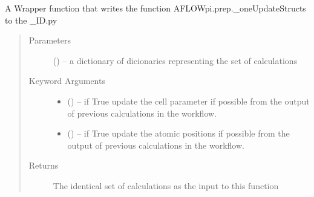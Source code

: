 \documentclass[letterpaper,10pt,english]{sphinxmanual}
\begin{document}

\begin{fulllineitems}
\label{\detokenize{prep:prep.updateStructs}}
A Wrapper function that writes the function AFLOWpi.prep.\_oneUpdateStructs to the \_ID.py
\begin{quote}\begin{description}
\item[{Parameters}] \leavevmode
{} () -- a dictionary of dicionaries representing the set of calculations

\item[{Keyword Arguments}] \leavevmode\begin{itemize}
\item {} 
 () -- if True update the cell parameter if possible from the
output of previous calculations in the workflow.

\item {} 
 () -- if True update the atomic positions if possible from the
output of previous calculations in the workflow.

\end{itemize}

\item[{Returns}] \leavevmode
The identical set of calculations as the input to this function

\end{description}\end{quote}

\end{fulllineitems}


\begin{fulllineitems}
\label{\detokenize{prep:prep.updatelogs}}
\end{fulllineitems}

\end{document}
